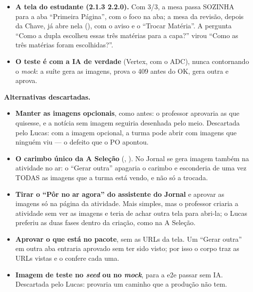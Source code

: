\begin{itemize}
    aprovadas. Na lista, a atividade sem o OK é \enquote{Em preparo} e não
    oferece \enquote{Usar esta atividade agora}; a página dela mostra o cartão
    \enquote{Aprove as imagens antes de abrir a turma} e a grade antes das
    equipes.
  \item \textbf{A tela do estudante (2.1.3 \seta{} 2.2.0).} Com 3/3, a mesa
    passa SOZINHA para a aba \enquote{Primeira Página}, com o foco na aba; a
    mesa da revisão, depois da Chave, já abre nela (), com o
    aviso e o \enquote{Trocar Matéria}. A pergunta \enquote{Como a dupla
    escolheu essas três matérias para a capa?} virou \enquote{Como as três
    matérias foram escolhidas?}.
  \item \textbf{O teste é com a IA de verdade} (Vertex, com o ADC), nunca
    contornando o \emph{mock}: a suíte 
    gera as imagens, prova o 409 antes do OK, gera outra e aprova.
\end{itemize}

\textbf{Alternativas descartadas.}

\begin{itemize}
  \item \textbf{Manter as imagens opcionais}, como antes: o professor
    aprovaria as que quisesse, e a notícia sem imagem seguiria desenhada pelo
    meio. Descartada pelo Lucas: com a imagem opcional, a turma pode abrir com
    imagens que ninguém viu --- o defeito que o PO apontou.
  \item \textbf{O carimbo único da A Seleção} (,
    ). No Jornal se gera imagem também na atividade no ar: o
    \enquote{Gerar outra} apagaria o carimbo e esconderia de uma vez TODAS as
    imagens que a turma está vendo, e não só a trocada.
  \item \textbf{Tirar o \enquote{Pôr no ar agora} do assistente do Jornal} e
    aprovar as imagens só na página da atividade. Mais simples, mas o professor
    criaria a atividade sem ver as imagens e teria de achar outra tela para
    abri-la; o Lucas preferiu as duas fases dentro da criação, como na A
    Seleção.
  \item \textbf{Aprovar o que está no pacote}, sem as URLs da tela. Um
    \enquote{Gerar outra} em outra aba entraria aprovado sem ter sido visto;
    por isso o corpo traz as URLs vistas e o  confere cada uma.
  \item \textbf{Imagem de teste no \emph{seed} ou no \emph{mock}}, para a e2e
    passar sem IA. Descartada pelo Lucas: provaria um caminho que a produção
    não tem.
\end{itemize}

